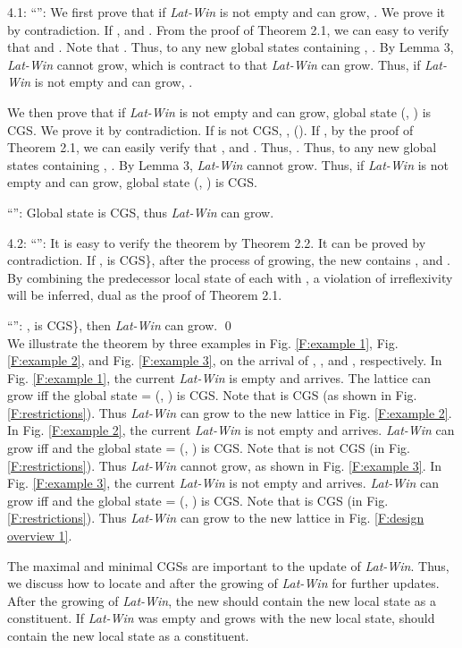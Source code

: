 \documentclass[12pt,journal,letterpaper,compsoc]{IEEEtran}
\begin{document}

4.1: ``'': We first prove that if {\it Lat-Win} is not empty and can grow, . We prove it by contradiction. If ,  and . From the proof of Theorem 2.1, we can easy to verify that  and . Note that . Thus, to any new global states  containing , . By Lemma 3, {\it Lat-Win} cannot grow, which is contract to that {\it Lat-Win} can grow. Thus, if {\it Lat-Win} is not empty and can grow, .

We then prove that if {\it Lat-Win} is not empty and can grow, global state  (, ) is CGS. We prove it by contradiction. If  is not CGS, ,  (). If , by the proof of Theorem 2.1, we can easily verify that ,  and . Thus, . Thus, to any new global states  containing , . By Lemma 3, {\it Lat-Win} cannot grow. Thus, if {\it Lat-Win} is not empty and can grow, global state  (, ) is CGS.

``'': Global state  is CGS, thus {\it Lat-Win} can grow.

4.2: ``'': It is easy to verify the theorem by Theorem 2.2. It can be proved by contradiction. If ,  is CGS\}, after the process of growing, the new  contains , and . By combining the predecessor local state of each  with , a violation of irreflexivity will be inferred, dual as the proof of Theorem 2.1.

``'': ,  is CGS\}, then {\it Lat-Win} can grow. \qed \\

We illustrate the theorem by three examples in Fig. \ref{F:example 1}, Fig. \ref{F:example 2}, and Fig. \ref{F:example 3}, on the arrival of , , and , respectively. In Fig. \ref{F:example 1}, the current {\it Lat-Win} is empty and  arrives. The lattice can grow iff the global state  = (, ) is CGS. Note that  is CGS (as shown in Fig. \ref{F:restrictions}). Thus {\it Lat-Win} can grow to the new lattice in Fig. \ref{F:example 2}. In Fig. \ref{F:example 2}, the current {\it Lat-Win} is not empty and  arrives. {\it Lat-Win} can grow iff  and the global state  = (, ) is CGS. Note that  is not CGS (in Fig. \ref{F:restrictions}). Thus {\it Lat-Win} cannot grow, as shown in Fig. \ref{F:example 3}. In Fig. \ref{F:example 3}, the current {\it Lat-Win} is not empty and  arrives. {\it Lat-Win} can grow iff  and the global state  = (, ) is CGS. Note that  is CGS (in Fig. \ref{F:restrictions}). Thus {\it Lat-Win} can grow to the new lattice in Fig. \ref{F:design overview 1}.

The maximal and minimal CGSs are important to the update of {\it Lat-Win}. Thus, we discuss how to locate  and  after the growing of {\it Lat-Win} for further updates. After the growing of {\it Lat-Win}, the new  should contain the new local state as a constituent. If {\it Lat-Win} was empty and grows with the new local state,  should contain the new local state as a constituent.
\end{document}
